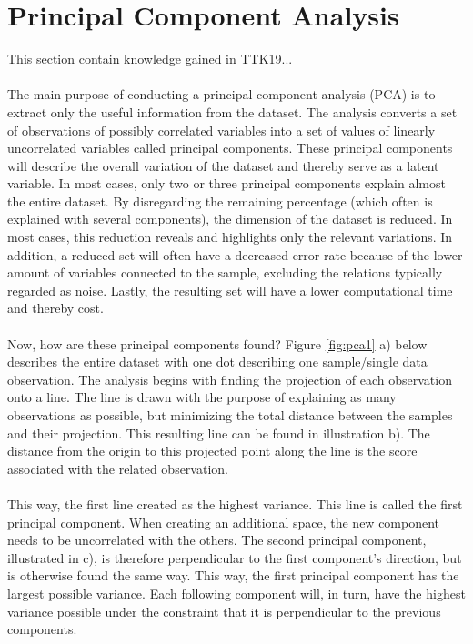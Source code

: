\section{Principal Component Analysis} \label{sec:pca}
This section contain knowledge gained in TTK19...
\\\\
The main purpose of conducting a principal component analysis (PCA) is to extract only the useful information from the dataset. The analysis converts a set of observations of possibly correlated variables into a set of values of linearly uncorrelated variables called principal components. These principal components will describe the overall variation of the dataset and thereby serve as a latent variable. In most cases, only two or three principal components explain almost the entire dataset. By disregarding the remaining percentage (which often is explained with several components), the dimension of the dataset is reduced. In most cases, this reduction reveals and highlights only the relevant variations. In addition, a reduced set will often have a decreased error rate because of the lower amount of variables connected to the sample, excluding the relations typically regarded as noise. Lastly, the resulting set will have a lower computational time and thereby cost.
\\\\
Now, how are these principal components found? Figure \ref{fig:pca1} a) below describes the entire dataset with one dot describing one sample/single data observation. The analysis begins with finding the projection of each observation onto a line. The line is drawn with the purpose of explaining as many observations as possible, but minimizing the total distance between the samples and their projection. This resulting line can be found in illustration b). The distance from the origin to this projected point along the line is the score associated with the related observation. 
\\\\
\noindent
This way, the first line created as the highest variance. This line is called the first principal component. When creating an additional space, the new component needs to be uncorrelated with the others. The second principal component, illustrated in c), is therefore perpendicular to the first component’s direction, but is otherwise found the same way. This way, the first principal component has the largest possible variance. Each following component will, in turn, have the highest variance possible under the constraint that it is perpendicular to the previous components.
